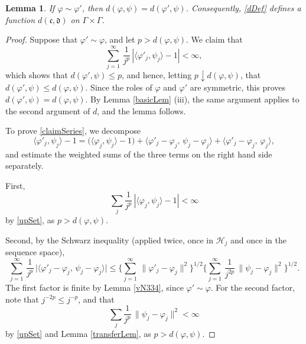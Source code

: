 \documentclass[twoside,11pt,letter]{article}
\def\cH{{\mathcal{H}}}
\def\fc{{\mathfrak{c}}}
\def\fd{{\mathfrak{d}}}
\theoremstyle{definition}
\theoremstyle{definition}
\theoremstyle{plain}
\newtheorem{lemma}[theorem]{Lemma}
\begin{document}
\begin{lemma}\label{classInv}
If $\varphi\sim\varphi'$, then $d(\varphi,\psi)=d(\varphi',\psi)$. Consequently, \eqref{dDef} defines a function $d(\fc,\fd)$ on $\Gamma\times\Gamma$.
\end{lemma}
\begin{proof}
Suppose that $\varphi'\sim\varphi$, and let $p>d(\varphi,\psi)$. We claim that
\begin{equation}\label{claimSeries}
\sum _{j=1}^\infty\,\frac{1}{j^p}\,|\langle \varphi'_j,\psi_j\rangle-1|<\infty,
\end{equation}
which shows that $d(\varphi',\psi)\leq p$, and hence, letting $p\downarrow d(\varphi,\psi)$, that $d(\varphi',\psi)\leq d(\varphi,\psi)$. Since the roles of $\varphi$ and $\varphi'$ are symmetric, this proves $d(\varphi',\psi)=d(\varphi,\psi)$. By Lemma \ref{basicLem} (iii), the same argument applies to the second argument of $d$, and the lemma follows.

To prove \eqref{claimSeries}, we decompose
\begin{equation*}
\langle \varphi'_j,\psi_j\rangle-1=\big(\langle \varphi_j,\psi_j\rangle-1\big)
+\langle\varphi'_j-\varphi_j,\,\psi_j-\varphi_j\rangle
+\langle\varphi'_j-\varphi_j,\,\varphi_j\rangle,
\end{equation*}
and estimate the weighted sums of the three terms on the right hand side separately.

First,
\begin{equation*}
\sum_j \frac{1}{j^p}\,|\langle \varphi_j,\psi_j\rangle-1|<\infty
\end{equation*}
by \eqref{upSet}, as $p>d(\varphi,\psi)$.

Second, by the Schwarz inequality (applied twice, once in $\cH_j$ and once in the sequence space),
\begin{equation*}
\sum_{j=1}^\infty\,\frac{1}{j^p}\,\big|\langle\varphi'_j-\varphi_j,\,\psi_j-\varphi_j\rangle\big|
\leq\Big\{\sum_{j=1}^\infty\,\|\varphi'_j-\varphi_j\|^2\Big\}^{1/2}
\Big\{\sum_{j=1}^\infty\,\frac{1}{j^{2p}}\,\|\psi_j-\varphi_j\|^2\Big\}^{1/2}.
\end{equation*}
The first factor is finite by Lemma \ref{vN334}, since $\varphi'\sim\varphi$. For the second factor, note that $j^{-2p}\leq j^{-p}$, and that
\begin{equation*}
\sum_j \frac{1}{j^p}\,\|\psi_j-\varphi_j\|^2<\infty
\end{equation*}
by \eqref{upSet} and Lemma \ref{transferLem}, as $p>d(\varphi,\psi)$.


\end{proof}
\end{document}
